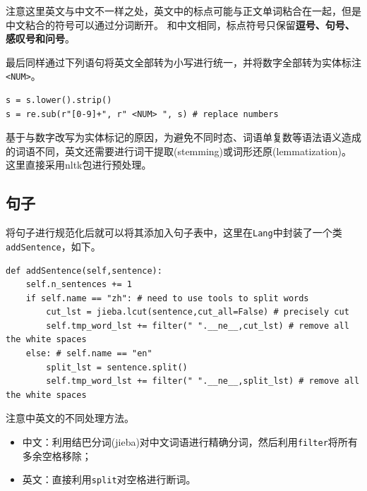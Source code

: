 \documentclass[logo,reportComp]{thesis}
\begin{document}
注意这里英文与中文不一样之处，英文中的标点可能与正文单词粘合在一起，但是中文粘合的符号可以通过分词断开。
和中文相同，标点符号只保留\textbf{逗号、句号、感叹号和问号}。

最后同样通过下列语句将英文全部转为小写进行统一，并将数字全部转为实体标注\verb'<NUM>'。
\begin{lstlisting}
s = s.lower().strip()
s = re.sub(r"[0-9]+", r" <NUM> ", s) # replace numbers
\end{lstlisting}

基于与数字改写为实体标记的原因，为避免不同时态、词语单复数等语法语义造成的词语不同，英文还需要进行词干提取(stemming)或词形还原(lemmatization)\cite{bib:stem}。
这里直接采用nltk包进行预处理。

\subsection{句子}
将句子进行规范化后就可以将其添加入句子表中，这里在\verb'Lang'中封装了一个类\verb'addSentence'，如下。
\begin{lstlisting}
def addSentence(self,sentence):
    self.n_sentences += 1
    if self.name == "zh": # need to use tools to split words
        cut_lst = jieba.lcut(sentence,cut_all=False) # precisely cut
        self.tmp_word_lst += filter(" ".__ne__,cut_lst) # remove all the white spaces
    else: # self.name == "en"
        split_lst = sentence.split()
        self.tmp_word_lst += filter(" ".__ne__,split_lst) # remove all the white spaces
\end{lstlisting}

注意中英文的不同处理方法。
\begin{itemize}
    \item 中文：利用结巴分词(jieba)对中文词语进行精确分词，然后利用\verb'filter'将所有多余空格移除；
    \item 英文：直接利用\verb'split'对空格进行断词。
\end{itemize}
\end{document}

